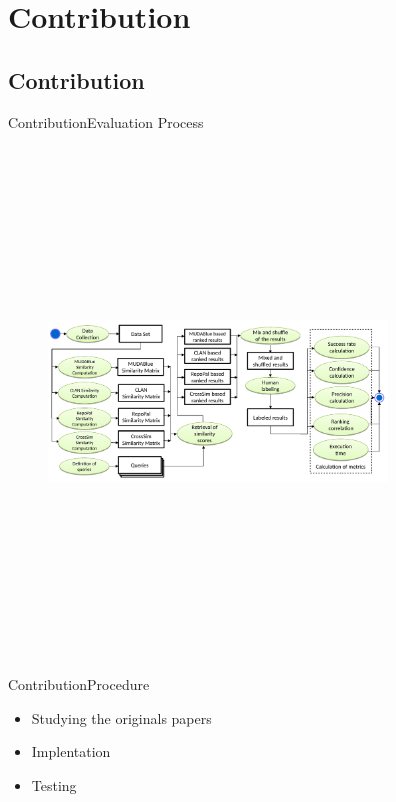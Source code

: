 \documentclass{beamer}
\begin{document}
\section{Contribution}
\subsection{Contribution}

\begin{frame}{Contribution}{Evaluation Process}
	\begin{figure}[!h]
	\includegraphics[width=9cm,height=13.5cm,keepaspectratio]{images/EvaluationProcess.pdf}
	\centering
	\label{fig:EvalProcess}
	\end{figure}
\end{frame}

\begin{frame}{Contribution}{Procedure}
	\begin{itemize}
		\item Studying the originals papers
		\item Implentation
		\item Testing
	\end{itemize}
\end{frame}
\end{document}
